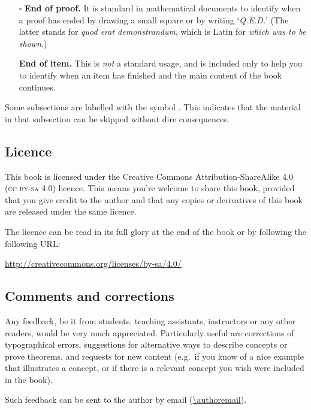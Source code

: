 \begin{itemize}
\item[$\square$] \textbf{End of proof.} It is standard in mathematical documents to identify when a proof has ended by drawing a small square or by writing `\textit{Q.E.D.}' (The latter stands for \textit{quod erat demonstrandum}, which is Latin for \textit{which was to be shown}.)
\item[\nonproofqedsymbol] \textbf{End of item.} This is \textit{not} a standard usage, and is included only to help you to identify when an item has finished and the main content of the book continues.
\end{itemize}

Some subsections are labelled with the symbol \optmarksymbol{}. This indicates that the material in that subsection can be skipped without dire consequences.

\subsection*{Licence}

This book is licensed under the Creative Commons Attribution-ShareAlike 4.0 (\textsc{cc by-sa 4.0}) licence. This means you're welcome to share this book, provided that you give credit to the author and that any copies or derivatives of this book are released under the same licence.

The licence can be read in its full glory at the end of the book or by following the following URL:
\begin{center}
\url{http://creativecommons.org/licenses/by-sa/4.0/}
\end{center}

\subsection*{Comments and corrections}

Any feedback, be it from students, teaching assistants, instructors or any other readers, would be very much appreciated. Particularly useful are corrections of typographical errors, suggestions for alternative ways to describe concepts or prove theorems, and requests for new content (e.g.\ if you know of a nice example that illustrates a concept, or if there is a relevant concept you wish were included in the book).

Such feedback can be sent to the author by email (\url{\authoremail}).